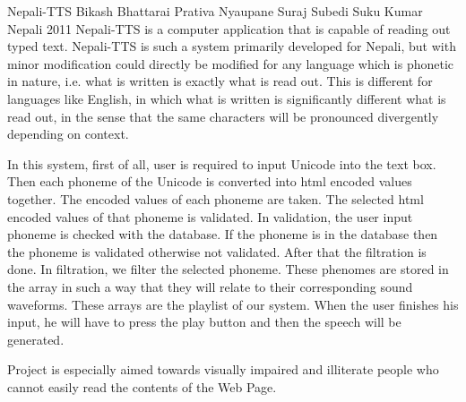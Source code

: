  \begin{conf-abstract}[]
{Nepali-TTS}
{ Bikash Bhattarai
  Prativa Nyaupane
  Suraj Subedi
  Suku Kumar Nepali 
}
{2011}
Nepali-TTS is a computer application that is capable of reading out typed text. Nepali-TTS is such a system primarily developed for Nepali, but with minor modification could directly be modified for any language which is phonetic in nature, i.e. what is written is exactly what is read out. This is different for languages like English, in which what is written is significantly different what is read out, in the sense that the same characters will be pronounced divergently depending on context.

In this system, first of all, user is required to input Unicode into the text box. Then each phoneme of the Unicode is converted into html encoded values together. The encoded values of each phoneme are taken. The selected html encoded values of that phoneme is validated. In validation, the user input phoneme is checked with the database. If the phoneme is in the database then the phoneme is validated otherwise not validated. After that the filtration is done. In filtration, we filter the selected phoneme. These phenomes are stored in the array in such a way that they will relate to their corresponding sound waveforms. These arrays are the playlist of our system. When the user finishes his input, he will have to press the play button and then the speech will be generated.

Project is especially aimed towards visually impaired and illiterate people who cannot easily read the contents of the Web Page.  
  \end{conf-abstract}